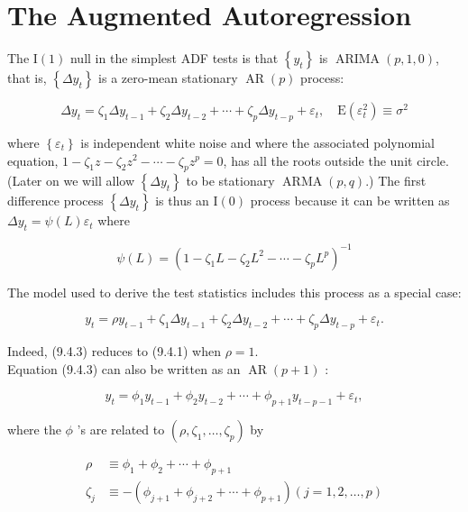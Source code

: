 \documentclass[10pt]{article}
\begin{document}
\section*{The Augmented Autoregression}
The $\mathrm{I}(1)$ null in the simplest ADF tests is that $\left\{y_{t}\right\}$ is $\operatorname{ARIMA}(p, 1,0)$, that is, $\left\{\Delta y_{t}\right\}$ is a zero-mean stationary $\operatorname{AR}(p)$ process:


\begin{equation*}
\Delta y_{t}=\zeta_{1} \Delta y_{t-1}+\zeta_{2} \Delta y_{t-2}+\cdots+\zeta_{p} \Delta y_{t-p}+\varepsilon_{t}, \quad \mathrm{E}\left(\varepsilon_{t}^{2}\right) \equiv \sigma^{2} \tag{9.4.1}
\end{equation*}


where $\left\{\varepsilon_{t}\right\}$ is independent white noise and where the associated polynomial equation, $1-\zeta_{1} z-\zeta_{2} z^{2}-\cdots-\zeta_{p} z^{p}=0$, has all the roots outside the unit circle. (Later on we will allow $\left\{\Delta y_{t}\right\}$ to be stationary $\operatorname{ARMA}(p, q)$.) The first difference process $\left\{\Delta y_{t}\right\}$ is thus an $\mathrm{I}(0)$ process because it can be written as $\Delta y_{t}=\psi(L) \varepsilon_{t}$ where


\begin{equation*}
\psi(L)=\left(1-\zeta_{1} L-\zeta_{2} L^{2}-\cdots-\zeta_{p} L^{p}\right)^{-1} \tag{9.4.2}
\end{equation*}


The model used to derive the test statistics includes this process as a special case:


\begin{equation*}
y_{t}=\rho y_{t-1}+\zeta_{1} \Delta y_{t-1}+\zeta_{2} \Delta y_{t-2}+\cdots+\zeta_{p} \Delta y_{t-p}+\varepsilon_{t} . \tag{9.4.3}
\end{equation*}


Indeed, (9.4.3) reduces to (9.4.1) when $\rho=1$.\\
Equation (9.4.3) can also be written as an $\operatorname{AR}(p+1)$ :


\begin{equation*}
y_{t}=\phi_{1} y_{t-1}+\phi_{2} y_{t-2}+\cdots+\phi_{p+1} y_{t-p-1}+\varepsilon_{t}, \tag{9.4.4}
\end{equation*}


where the $\phi$ 's are related to $\left(\rho, \zeta_{1}, \ldots, \zeta_{p}\right)$ by


\begin{align*}
\rho & \equiv \phi_{1}+\phi_{2}+\cdots+\phi_{p+1} \\
\zeta_{j} & \equiv-\left(\phi_{j+1}+\phi_{j+2}+\cdots+\phi_{p+1}\right)(j=1,2, \ldots, p) \tag{9.4.5}
\end{align*}
\end{document}
